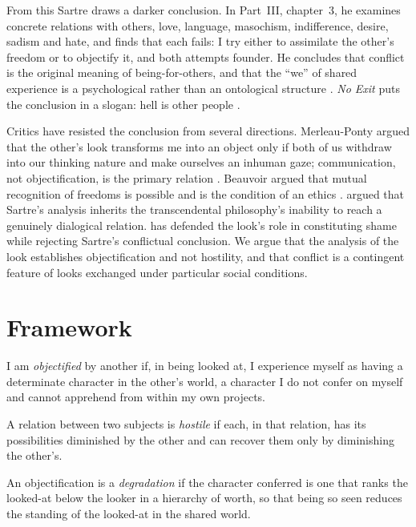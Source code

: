 \documentclass{situationist-preprint}
\begin{document}
From this Sartre draws a darker conclusion. In Part~III, chapter~3, he examines concrete relations with others, love, language, masochism, indifference, desire, sadism and hate, and finds that each fails: I try either to assimilate the other's freedom or to objectify it, and both attempts founder. He concludes that conflict is the original meaning of being-for-others, and that the \enquote{we} of shared experience is a psychological rather than an ontological structure \citep[Part~III, ch.~3]{Sartre1943}. \emph{No Exit} puts the conclusion in a slogan: hell is other people \citep{Sartre1944}.

Critics have resisted the conclusion from several directions. Merleau-Ponty argued that the other's look transforms me into an object only if both of us withdraw into our thinking nature and make ourselves an inhuman gaze; communication, not objectification, is the primary relation \citep{MerleauPonty1945}. Beauvoir argued that mutual recognition of freedoms is possible and is the condition of an ethics \citep{Beauvoir1947}. \citet{Theunissen1965} argued that Sartre's analysis inherits the transcendental philosophy's inability to reach a genuinely dialogical relation. \citet{Zahavi2014} has defended the look's role in constituting shame while rejecting Sartre's conflictual conclusion. We argue that the analysis of the look establishes objectification and not hostility, and that conflict is a contingent feature of looks exchanged under particular social conditions.

\section{Framework}

\begin{definition}[Objectification]\label{d:obj}
I am \emph{objectified} by another if, in being looked at, I experience myself as having a determinate character in the other's world, a character I do not confer on myself and cannot apprehend from within my own projects.
\end{definition}

\begin{definition}[Hostility]\label{d:host}
A relation between two subjects is \emph{hostile} if each, in that relation, has its possibilities diminished by the other and can recover them only by diminishing the other's.
\end{definition}

\begin{definition}[Degradation]\label{d:degr}
An objectification is a \emph{degradation} if the character conferred is one that ranks the looked-at below the looker in a hierarchy of worth, so that being so seen reduces the standing of the looked-at in the shared world.
\end{definition}
\end{document}

